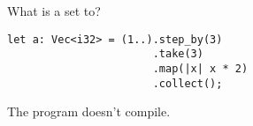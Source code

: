 %
%
What is a set to?

\begin{lstlisting}
let a: Vec<i32> = (1..).step_by(3)
                       .take(3)
                       .map(|x| x * 2)
                       .collect();
\end{lstlisting}

  \choice {[2, 4, 6]}
  \choice The program doesn't compile.
  \choice {[4, 10, 16]}
  \choice {[2. 8, 14]}
